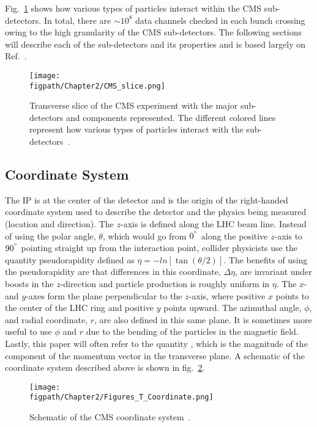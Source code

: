 Fig.~\ref{fig:CMS_transverse} shows how various types of particles interact within the CMS sub-detectors.
In total, there are ${\sim}10^8$ data channels checked in each bunch crossing owing to the high granularity of the CMS sub-detectors.
The following sections will describe each of the sub-detectors and its properties and is based largely on Ref.~\cite{Chatrchyan:2008aa}.

\begin{figure}[!hbt]
	\centering
	\texttt{[image: \\figpath/Chapter2/CMS\_slice.png]}
	\caption{Transverse slice of the CMS experiment with the major sub-detectors and components represented. The different colored lines represent how various types of particles interact with the sub-detectors~\cite{CMSSlice}.}
	\label{fig:CMS_transverse}
\end{figure}

\subsection{Coordinate System}

The IP is at the center of the detector and is the origin of the right-handed coordinate system used to describe the detector and the physics being measured (location and direction).
The $z$-axis is defined along the LHC beam line.
Instead of using the polar angle, $\theta$, which would go from $0^{^\circ}$ along the positive $z$-axis to $90^{^\circ}$ pointing straight up from the interaction point, collider physicists use the quantity pseudorapidity defined as $\eta=-ln\left[\tan\left(\theta/2\right)\right]$.
The benefits of using the pseudorapidity are that differences in this coordinate, $\Delta\eta$, are invariant under boosts in the $z$-direction and particle production is roughly uniform in $\eta$.
The $x$- and $y$-axes form the plane perpendicular to the $z$-axis, where positive $x$ points to the center of the LHC ring and positive $y$ points upward.
The azimuthal angle, $\phi$, and radial coordinate, $r$, are also defined in this same plane.
It is sometimes more useful to use $\phi$ and $r$ due to the bending of the particles in the magnetic field.
Lastly, this paper will often refer to the quantity \pt, which is the magnitude of the component of the momentum vector in the transverse plane.
A schematic of the coordinate system described above is shown in fig.~\ref{fig:CMS_coordinate_system}.

\begin{figure}[!hbt]
	\centering
	\texttt{[image: \\figpath/Chapter2/Figures\_T\_Coordinate.png]}
	\caption{Schematic of the CMS coordinate system~\cite{Schott:2014sea}.}
	\label{fig:CMS_coordinate_system}
\end{figure}

